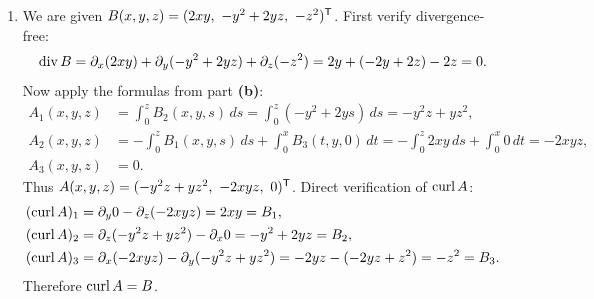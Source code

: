 \begin{exercisesolution}
\begin{enumerate}[label=\textbf{(\alph*)}]
  \item We are given $B(x,y,z) = (2xy,\ -y^2 + 2yz,\ -z^2)^{\mathsf{T}}$.
    First verify divergence-free:
    \[\operatorname{div} B = \partial_x(2xy) + \partial_y(-y^2 + 2yz) + \partial_z(-z^2) = 2y + (-2y + 2z) - 2z = 0.\]
    Now apply the formulas from part \textbf{(b)}:
    \begin{align*}
      A_1(x,y,z) &= \int_0^z B_2(x,y,s)\,ds = \int_0^z (-y^2 + 2ys)\,ds = -y^2 z + yz^2, \\
      A_2(x,y,z) &= -\int_0^z B_1(x,y,s)\,ds + \int_0^x B_3(t,y,0)\,dt = -\int_0^z 2xy\,ds + \int_0^x 0\,dt = -2xyz, \\
      A_3(x,y,z) &= 0.
    \end{align*}
    Thus $A(x,y,z) = (-y^2 z + yz^2,\ -2xyz,\ 0)\transp$.
    Direct verification of $\operatorname{curl} A$:
    \begin{align*}
      (\operatorname{curl} A)_1 &= \partial_y 0 - \partial_z(-2xyz) = 2xy = B_1, \\
      (\operatorname{curl} A)_2 &= \partial_z(-y^2 z + yz^2) - \partial_x 0 = -y^2 + 2yz = B_2, \\
      (\operatorname{curl} A)_3 &= \partial_x(-2xyz) - \partial_y(-y^2 z + yz^2) = -2yz - (-2yz + z^2) = -z^2 = B_3.
    \end{align*}
    Therefore $\operatorname{curl} A = B$.
\end{enumerate}
\end{exercisesolution}
